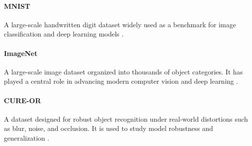 \documentclass{article}
\begin{document}
\paragraph{MNIST}
A large-scale handwritten digit dataset widely used as a benchmark for image classification and deep learning models \cite{lecun-mnisthandwrittendigit-2010,lecun-gradientbased-learning-applied-1998}.

\paragraph{ImageNet}
A large-scale image dataset organized into thousands of object categories. It has played a central role in advancing modern computer vision and deep learning \cite{DenDon09Imagenet}.

\paragraph{CURE-OR}
A dataset designed for robust object recognition under real-world distortions such as blur, noise, and occlusion. It is used to study model robustness and generalization \cite{Temel2018_ICMLA,Temel2019_ICIP}.



\end{document}

